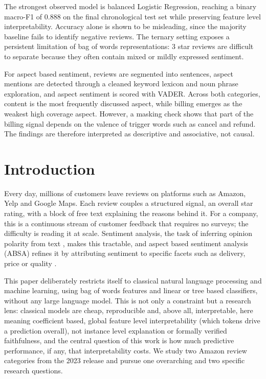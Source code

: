 \documentclass[11pt,a4paper,DIV=12]{scrartcl}
\begin{document}
The strongest observed model is balanced Logistic Regression, reaching a binary
macro-F1 of $0.888$ on the final chronological test set while preserving feature
level interpretability. Accuracy alone is shown to be misleading, since the
majority baseline fails to identify negative reviews. The ternary setting
exposes a persistent limitation of bag of words representations: 3 star reviews
are difficult to separate because they often contain mixed or mildly expressed
sentiment.

For aspect based sentiment, reviews are segmented into sentences, aspect
mentions are detected through a cleaned keyword lexicon and noun phrase
exploration, and aspect sentiment is scored with VADER. Across both categories,
content is the most frequently discussed aspect, while billing emerges as the
weakest high coverage aspect. However, a masking check shows that part of the
billing signal depends on the valence of trigger words such as cancel and
refund. The findings are therefore interpreted as descriptive and associative,
not causal.

\clearpage
\tableofcontents
\clearpage

\section{Introduction}
\label{sec:intro}

Every day, millions of customers leave reviews on platforms such as Amazon,
Yelp and Google Maps. Each review couples a structured signal, an overall
star rating, with a block of free text explaining the reasons behind it. For
a company, this is a continuous stream of customer feedback that requires no
surveys; the difficulty is reading it at scale. Sentiment analysis, the
task of inferring opinion polarity from text \citep{pang2008opinion}, makes this
tractable, and aspect based sentiment analysis (ABSA) refines it by
attributing sentiment to specific facets such as delivery, price or quality
\citep{pontiki2014semeval}.

This paper deliberately restricts itself to classical natural language
processing and machine learning, using bag of words features and linear or
tree based classifiers, without any large language model. This is not only a
constraint but a research lens: classical models are cheap, reproducible and,
above all, interpretable, here meaning coefficient based, global
feature level interpretability (which tokens drive a prediction overall), not
instance level explanation or formally verified faithfulness, and the
central question of this work is how much predictive performance, if any,
that interpretability costs. We study two
Amazon review categories from the 2023 release \citep{hou2024bridging} and
pursue one overarching and two specific research questions.
\end{document}
